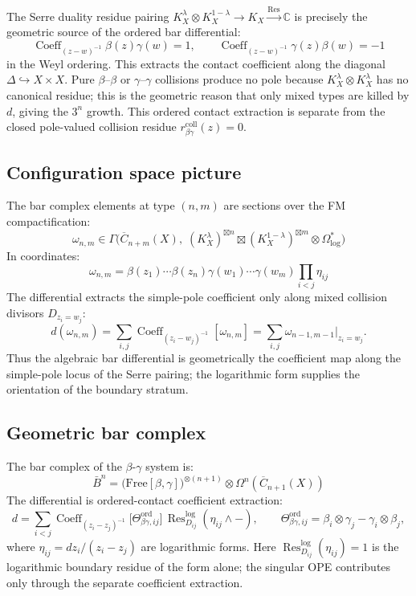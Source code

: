 \begin{remark}
\label{rem:bundle-bar-mechanism}
The Serre duality residue pairing
$K_X^\lambda \otimes K_X^{1-\lambda} \to K_X
\xrightarrow{\mathrm{Res}} \mathbb{C}$ is precisely the geometric
source of the ordered bar differential:
\[
 \operatorname{Coeff}_{(z-w)^{-1}}\beta(z)\gamma(w)=1,
 \qquad
 \operatorname{Coeff}_{(z-w)^{-1}}\gamma(z)\beta(w)=-1
\]
in the Weyl ordering. This extracts the contact coefficient along
the diagonal $\Delta \hookrightarrow X \times X$. Pure
$\beta$--$\beta$ or $\gamma$--$\gamma$ collisions produce no pole
because $K_X^\lambda \otimes K_X^\lambda$ has no canonical residue;
this is the geometric reason that only mixed types are killed by $d$,
giving the $3^n$ growth. This ordered contact extraction is separate
from the closed pole-valued collision residue
$r^{\mathrm{coll}}_{\beta\gamma}(z)=0$.
\end{remark}

\subsection{Configuration space picture}

The bar complex elements at type $(n,m)$ are sections over the FM compactification:
\[\omega_{n,m} \in \Gamma\bigl(\overline{C}_{n+m}(X),\; (K_X^\lambda)^{\boxtimes n} \boxtimes (K_X^{1-\lambda})^{\boxtimes m} \otimes \Omega^*_{\log}\bigr)\]
In coordinates:
\[\omega_{n,m} = \beta(z_1) \cdots \beta(z_n) \gamma(w_1) \cdots \gamma(w_m) \prod_{i<j} \eta_{ij}\]
The differential extracts the simple-pole coefficient only along
mixed collision divisors $D_{z_i = w_j}$:
\[
d(\omega_{n,m})
= \sum_{i,j}
\operatorname{Coeff}_{(z_i-w_j)^{-1}}[\omega_{n,m}]
= \sum_{i,j}\omega_{n-1,m-1}\big|_{z_i=w_j}.
\]
Thus the algebraic bar differential is geometrically the coefficient
map along the simple-pole locus of the Serre pairing; the logarithmic
form supplies the orientation of the boundary stratum.

\subsection{Geometric bar complex}

\begin{theorem}
\label{thm:beta-gamma-bar}
The bar complex of the $\beta$-$\gamma$ system is:
\[
\bar{B}^n = \bigl(\mathrm{Free}[\beta, \gamma]\bigr)^{\otimes (n+1)} \otimes \Omega^n(\overline{C}_{n+1}(X))
\]
The differential is ordered-contact coefficient extraction:
\[
d = \sum_{i<j}
\operatorname{Coeff}_{(z_i-z_j)^{-1}}
\bigl[\Theta_{\beta\gamma,ij}^{\mathrm{ord}}\bigr]\,
\operatorname{Res}^{\log}_{D_{ij}}(\eta_{ij}\wedge -),
\qquad
\Theta_{\beta\gamma,ij}^{\mathrm{ord}}
=\beta_i\otimes\gamma_j-\gamma_i\otimes\beta_j,
\]
where $\eta_{ij} = dz_i/(z_i-z_j)$ are logarithmic forms.
Here $\operatorname{Res}^{\log}_{D_{ij}}(\eta_{ij})=1$ is the
logarithmic boundary residue of the form alone; the singular OPE
contributes only through the separate coefficient extraction.
\end{theorem}

